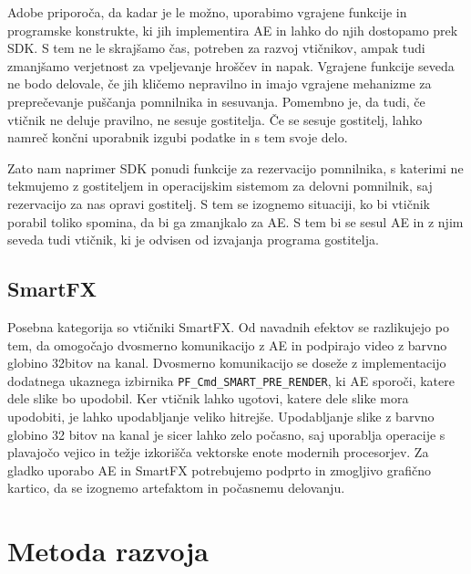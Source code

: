 \documentclass[a4paper, 12pt]{book}
\begin{document}

Adobe priporoča, da kadar je le možno, uporabimo vgrajene funkcije in programske konstrukte, ki jih implementira AE in lahko do njih dostopamo prek SDK. 
S tem ne le skrajšamo čas, potreben za razvoj vtičnikov, ampak tudi zmanjšamo verjetnost za vpeljevanje hroščev in napak. 
Vgrajene funkcije seveda ne bodo delovale, če jih kličemo nepravilno in imajo vgrajene mehanizme za preprečevanje puščanja pomnilnika in sesuvanja. 
Pomembno je, da tudi, če vtičnik ne deluje pravilno, ne sesuje gostitelja. 
Če se sesuje gostitelj, lahko namreč končni uporabnik izgubi podatke in s tem svoje delo. 

Zato nam naprimer SDK ponudi funkcije za rezervacijo pomnilnika, s katerimi ne tekmujemo z gostiteljem in operacijskim sistemom za delovni pomnilnik, saj rezervacijo za nas opravi gostitelj.
S tem se izognemo situaciji, ko bi vtičnik porabil toliko spomina, da bi ga zmanjkalo za AE. 
S tem bi se sesul AE in z njim seveda tudi vtičnik, ki je odvisen od izvajanja programa gostitelja.


\subsection{SmartFX}

Posebna kategorija so vtičniki SmartFX. 
Od navadnih efektov se razlikujejo po tem, da omogočajo dvosmerno komunikacijo z AE in podpirajo video z barvno globino 32bitov na kanal\cite{aesdk}. 
Dvosmerno komunikacijo se doseže z  implementacijo dodatnega ukaznega izbirnika {\tt PF\_Cmd\_SMART\_PRE\_RENDER}, ki AE sporoči, katere dele slike bo upodobil. 
Ker vtičnik lahko ugotovi, katere dele slike mora upodobiti, je lahko upodabljanje veliko hitrejše.
Upodabljanje slike z barvno globino 32 bitov na kanal je sicer lahko zelo počasno, saj uporablja operacije s plavajočo vejico in težje izkorišča vektorske enote modernih procesorjev.
Za gladko uporabo AE in SmartFX potrebujemo podprto in zmogljivo grafično kartico, da se izognemo artefaktom in počasnemu delovanju\cite{preproccclassroom}.


\section{Metoda razvoja}
\end{document}
